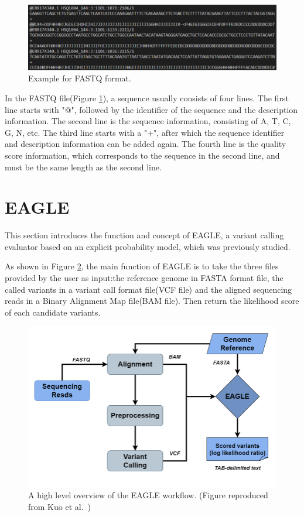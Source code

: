 \documentclass[PhD]{PHlab-thesis}
\begin{document}
\begin{figure}[h!]
	\centering
	\includegraphics[scale=0.3]{figures/Example for FASTQ format.png}
	\caption{Example for FASTQ format.}
	\label{fig:FASTQ format} %
\end{figure}

In the FASTQ file(Figure \ref{fig:FASTQ format}), a sequence usually consists of four lines. The first line starts with "@", followed by the identifier of the sequence and the description information. The second line is the sequence information, consisting of A, T, C, G, N, etc. The third line starts with a "+", after which the sequence identifier and description information can be added again. The fourth line is the quality score information, which corresponds to the sequence in the second line, and must be the same length as the second line.

\section{EAGLE}
This section introduces the function and concept of EAGLE, a variant calling evaluator based on an explicit probability model, which was previously studied.

As shown in Figure \ref{fig:EAGLE workflow}, the main function of EAGLE is to take the three files provided by the user as input:the reference genome in FASTA format file, the called variants in a variant call format file(VCF file) and the aligned sequencing reads in a Binary Alignment Map file(BAM file). Then return the likelihood score of each candidate variants.

\begin{figure}[h!]
	\centering
	\includegraphics[scale=0.3]{figures/EAGLE.png}
	\caption{A high level overview of the EAGLE workflow. (Figure reproduced from Kuo et al.~\cite{Kuo2018EAGLE})}
	\label{fig:EAGLE workflow} %
\end{figure}
\end{document}
